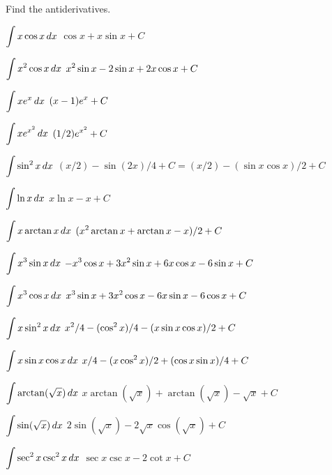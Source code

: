 \exercises

Find the antiderivatives.

\twocol

\exercise $\displaystyle\int x\cos x\,dx$
\answer $\cos x+x\sin x+C$
\endanswer
\endexercise

\exercise $\displaystyle\int x^2\cos x\,dx$
\answer $\displaystyle x^2\sin x-2 \sin x+2x\cos x +C$
\endanswer
\endexercise

\exercise $\displaystyle\int xe^x\,dx$
\answer $\displaystyle (x-1)e^x +C$
\endanswer
\endexercise

\exercise $\displaystyle\int xe^{x^2}\,dx$
\answer $\displaystyle (1/2)e^{x^2} +C$
\endanswer
\endexercise

\exercise $\displaystyle\int \sin^2 x\,dx$
\answer $(x/2)-\sin(2x)/4 +C=$\hfill\break$(x/2)-(\sin x\cos x)/2+C$
\endanswer
\endexercise

\exercise $\displaystyle\int \ln x\,dx$
\answer $x\ln x-x +C$
\endanswer
\endexercise

\exercise $\displaystyle\int x\arctan x\,dx$
\answer $\displaystyle (x^2\arctan x +\arctan x -x)/2+C$
\endanswer
\endexercise

\exercise $\displaystyle\int x^3\sin x\,dx$
\answer $\displaystyle -x^3\cos x+3x^2\sin x+6x\cos x-6\sin x+C$
\endanswer
\endexercise

\exercise $\displaystyle\int x^3\cos x\,dx$
\answer $\displaystyle x^3\sin x+3x^2\cos x-6x\sin x-6\cos x+C$
\endanswer
\endexercise

\exercise $\displaystyle\int x\sin^2 x\,dx$
\answer $\displaystyle x^2/4-(\cos^2 x)/4-(x\sin x\cos x)/2+C$
\endanswer
\endexercise

\exercise $\displaystyle\int x\sin x\cos x\,dx$
\answer $\displaystyle x/4-(x\cos^2 x)/2+(\cos x\sin x)/4+C$
\endanswer
\endexercise

\exercise $\displaystyle\int \arctan(\sqrt x)\,dx$
\answer $x\arctan(\sqrt x)+\arctan(\sqrt x)-\sqrt{x}+C$
\endanswer
\endexercise

\exercise $\displaystyle\int \sin(\sqrt x)\,dx$
\answer $2\sin(\sqrt x)-2\sqrt x\cos(\sqrt x)+C$
\endanswer
\endexercise

\exercise $\displaystyle\int\sec^2 x\csc^2 x\,dx$
\answer $\sec x\csc x-2\cot x+C$
\endanswer

\endtwocol
\endexercise

\endexercises

